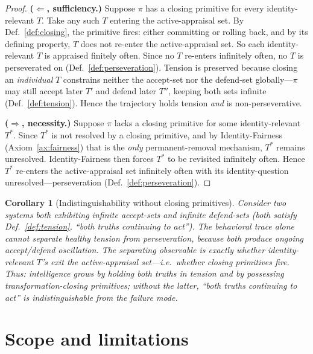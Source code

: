 \documentclass[11pt]{article}
\newtheorem{corollary}{Corollary}
\begin{document}
\begin{proof}
\textbf{($\Leftarrow$, sufficiency.)} Suppose $\pi$ has a closing primitive for
every identity-relevant $T$. Take any such $T$ entering the active-appraisal set.
By Def.~\ref{def:closing}, the primitive fires: either committing or rolling back,
and by its defining property, $T$ does not re-enter the active-appraisal set. So
each identity-relevant $T$ is appraised finitely often. Since no $T$ re-enters
infinitely often, no $T$ is perseverated on (Def.~\ref{def:perseveration}). Tension
is preserved because closing an \emph{individual} $T$ constrains neither the
accept-set nor the defend-set globally---$\pi$ may still accept later $T'$ and
defend later $T''$, keeping both sets infinite (Def.~\ref{def:tension}). Hence the
trajectory holds tension \emph{and} is non-perseverative.

\medskip
\textbf{($\Rightarrow$, necessity.)} Suppose $\pi$ lacks a closing primitive for
some identity-relevant $T^*$. Since $T^*$ is not resolved by a closing primitive,
and by Identity-Fairness (Axiom~\ref{ax:fairness}) that is the \emph{only}
permanent-removal mechanism, $T^*$ remains unresolved. Identity-Fairness then
forces $T^*$ to be revisited infinitely often. Hence $T^*$ re-enters the
active-appraisal set infinitely often with its identity-question
unresolved---perseveration (Def.~\ref{def:perseveration}).
\end{proof}

\begin{corollary}[Indistinguishability without closing primitives]
\label{cor:indist}
Consider two systems both exhibiting infinite accept-sets and infinite defend-sets
(both satisfy Def.~\ref{def:tension}, ``both truths continuing to act''). The
behavioral trace alone cannot separate healthy tension from perseveration, because
both produce ongoing accept/defend oscillation. The separating observable is exactly
whether identity-relevant $T$'s \emph{exit} the active-appraisal set---i.e.\ whether
closing primitives fire. Thus: intelligence grows by holding both truths in tension
\emph{and} by possessing transformation-closing primitives; without the latter,
``both truths continuing to act'' is indistinguishable from the failure mode.
\end{corollary}

\section{Scope and limitations}
\end{document}
